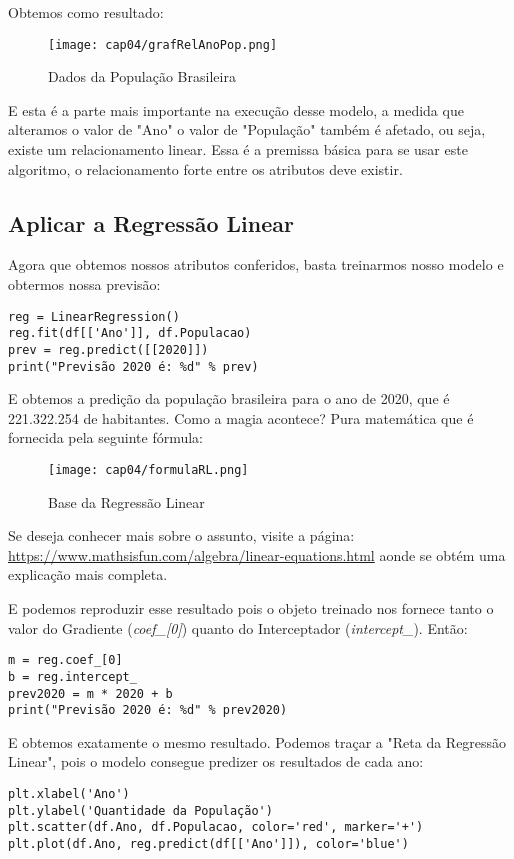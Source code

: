 Obtemos como resultado:
\begin{figure}[H]
	\centering
	\texttt{[image: cap04/grafRelAnoPop.png]}
	\caption{Dados da População Brasileira}
\end{figure}

E esta é a parte mais importante na execução desse modelo, a medida que alteramos o valor de "Ano" o valor de "População" também é afetado, ou seja, existe um relacionamento linear. Essa é a premissa básica para se usar este algoritmo, o relacionamento forte entre os atributos deve existir.

\subsection{Aplicar a Regressão Linear}
Agora que obtemos nossos atributos conferidos, basta treinarmos nosso modelo e obtermos nossa previsão:
\begin{lstlisting}[]
reg = LinearRegression()
reg.fit(df[['Ano']], df.Populacao)
prev = reg.predict([[2020]])
print("Previsão 2020 é: %d" % prev)
\end{lstlisting}

E obtemos a predição da população brasileira para o ano de 2020, que é 221.322.254 de habitantes. Como a magia acontece? Pura matemática que é fornecida pela seguinte fórmula:
\begin{figure}[H]
	\centering
	\texttt{[image: cap04/formulaRL.png]}
	\caption{Base da Regressão Linear}
\end{figure}

\begin{note}{}
	Se deseja conhecer mais sobre o assunto, visite a página: \url{https://www.mathsisfun.com/algebra/linear-equations.html} aonde se obtém uma explicação mais completa.
\end{note}

E podemos reproduzir esse resultado pois o objeto treinado nos fornece tanto o valor do Gradiente (\textit{coef\_[0]}) quanto do Interceptador (\textit{intercept\_}). Então:
\begin{lstlisting}[]
m = reg.coef_[0]
b = reg.intercept_
prev2020 = m * 2020 + b
print("Previsão 2020 é: %d" % prev2020)
\end{lstlisting}

E obtemos exatamente o mesmo resultado. Podemos traçar a "Reta da Regressão Linear", pois o modelo consegue predizer os resultados de cada ano:
\begin{lstlisting}[]
plt.xlabel('Ano')
plt.ylabel('Quantidade da População')
plt.scatter(df.Ano, df.Populacao, color='red', marker='+')
plt.plot(df.Ano, reg.predict(df[['Ano']]), color='blue')
\end{lstlisting}


